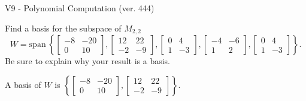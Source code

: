 \begin{exercise}
  \begin{exerciseTitle}V9 - Polynomial Computation (ver. 444)\end{exerciseTitle}
  \begin{exerciseStatement}
    Find a basis for the subspace of \(M_{2,2}\) 
\[W=\mathrm{span}\ \left\{\left[\begin{array}{cc}
-8 & -20 \\
0 & 10
\end{array}\right] , \left[\begin{array}{cc}
12 & 22 \\
-2 & -9
\end{array}\right] , \left[\begin{array}{cc}
0 & 4 \\
1 & -3
\end{array}\right] , \left[\begin{array}{cc}
-4 & -6 \\
1 & 2
\end{array}\right] , \left[\begin{array}{cc}
0 & 4 \\
1 & -3
\end{array}\right]\right\}.\]
 Be sure to explain why your result is a basis.


  \end{exerciseStatement}
  \begin{exerciseAnswer}
   A basis of \(W\) is  \(\left\{\left[\begin{array}{cc}
-8 & -20 \\
0 & 10
\end{array}\right] , \left[\begin{array}{cc}
12 & 22 \\
-2 & -9
\end{array}\right]\right\}\).
  


  \end{exerciseAnswer}
\end{exercise}